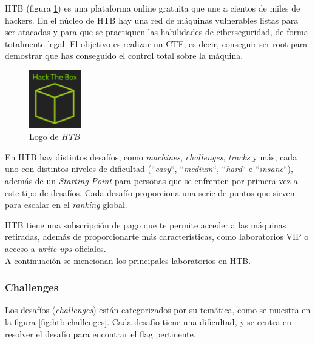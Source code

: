 \acrfull{HTB}\cite{htb} (figura \ref{fig:htb-logo}) es una plataforma online gratuita que une a cientos de miles de hackers. En el núcleo de \acrshort{HTB} hay una red de máquinas vulnerables listas para ser atacadas y para que se practiquen las habilidades de ciberseguridad, de forma totalmente legal. El objetivo es realizar un \acrshort{CTF}, es decir, conseguir ser root para demostrar que has conseguido el control total sobre la máquina.\\

\begin{figure}[h]
    \centering
    \includegraphics[width=0.20\textwidth]{images/sections/stateOfTheArt/htb-logo.png}
    \caption{Logo de \textit{\acrshort{HTB}}}
    \label{fig:htb-logo}
\end{figure}

En \acrshort{HTB} hay distintos desafíos, como \textit{machines}, \textit{challenges}, \textit{tracks} y más, cada uno con distintos niveles de dificultad (``\textit{easy}``, ``\textit{medium}``, ``\textit{hard}`` e ``\textit{insane}``), además de un \textit{Starting Point} para personas que se enfrenten por primera vez a este tipo de desafíos. Cada desafío proporciona una serie de puntos que sirven para escalar en el \textit{ranking} global.

\acrshort{HTB} tiene una subscripción de pago que te permite acceder a las máquinas retiradas, además de proporcionarte más características, como laboratorios VIP o acceso a \textit{write-ups} oficiales.\\

A continuación se mencionan los principales laboratorios en \acrshort{HTB}.

\subsubsection{Challenges}
Los desafíos (\textit{challenges}) están categorizados por su temática, como se muestra en la figura \ref{fig:htb-challenges}. Cada desafío tiene una dificultad, y se centra en resolver el desafío para encontrar el flag pertinente.

